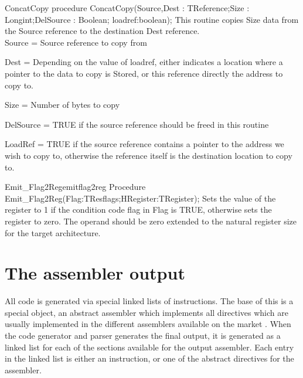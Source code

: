 \documentclass [a4paper,12pt]{article}
\begin{document}
\begin{procedure}{ConcatCopy}
\Declaration
procedure ConcatCopy(Source,Dest : TReference;Size : Longint;DelSource : Boolean; loadref:boolean);
\Description
This routine copies \textsf{Size} data from the \textsf{Source} reference to
the destination \textsf{Dest} reference. \\
\Parameters
Source = Source reference to copy from \par 
Dest = Depending on the value of loadref, either indicates a location where a pointer to the data to copy is
Stored, or this reference directly the address to copy to. \par
Size = Number of bytes to copy \par
DelSource = TRUE if the source reference should be freed in this routine \par
LoadRef = TRUE if the source reference contains a pointer to the address we
    wish to copy to, otherwise the reference itself is the destination
    location to copy to.
\end{procedure}

\begin{procedurel}{Emit{\_}Flag2Reg}{emitflag2reg}
\Declaration
Procedure Emit{\_}Flag2Reg(Flag:TResflags;HRegister:TRegister);
\Description
Sets the value of the register to 1 if the condition code flag in
\textsf{Flag} is TRUE, otherwise sets the register to zero.
\Notes
The operand should be zero extended to the natural register size for the
target architecture.
\end{procedurel}


\section{The assembler output}
\label{sec:mylabel8}

All code is generated via special linked lists of instructions. The base of
this is a special object, an abstract assembler which implements all
directives which are usually implemented in the different assemblers
available on the market . When the code generator and parser generates the
final output, it is generated as a linked list for each of the sections
available for the output assembler. Each entry in the linked list is either
an instruction, or one of the abstract directives for the assembler.
\end{document}
